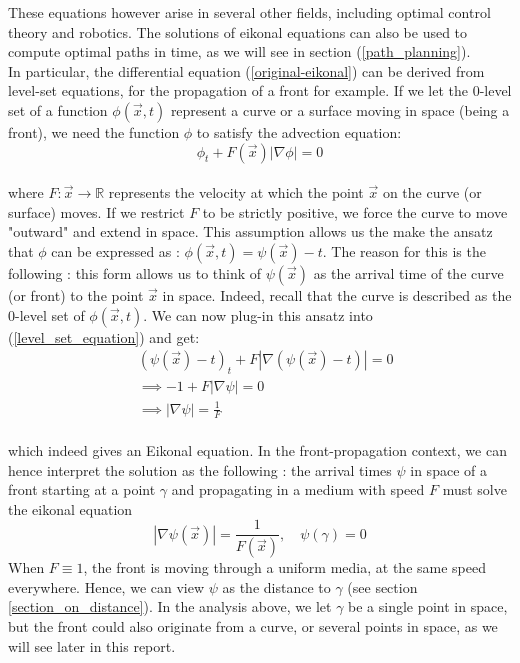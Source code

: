 \documentclass[11pt]{article}
\theoremstyle{definition}
\theoremstyle{remark}
\newcommand{\R}{\mathbb{R}}
\begin{document}
\noindent These equations however arise in several other fields, including optimal control theory and robotics. The solutions of eikonal equations can also be used to compute optimal paths in time, as we will see in section (\ref{path_planning}). \\

\noindent In particular, the differential equation (\ref{original-eikonal}) can be derived from level-set equations, for the propagation of a front for example. If we let the 0-level set of a function $\phi(\vec{x},t)$ represent a curve or a surface moving in space (being a front), we need the function $\phi$ to satisfy the advection equation: \\
\begin{equation}
\label{level_set_equation}
    \phi_t+F(\vec{x})|\nabla \phi| =0
\end{equation} \\
where $F:\vec{x}\rightarrow\R$ represents the velocity at which the point $\vec{x}$ on the curve (or surface) moves. If we restrict $F$ to be strictly positive, we force the curve to move "outward" and extend in space. This assumption allows us the make the ansatz that $\phi$ can be expressed as : $\phi(\vec{x},t)=\psi(\vec{x})-t$. The reason for this is the following : this form allows us to think of $\psi(\vec{x})$ as the arrival time of the curve (or front) to the point $\vec{x}$ in space. Indeed, recall that the curve is described as the 0-level set of $\phi(\vec{x},t)$. We can now plug-in this ansatz into (\ref{level_set_equation}) and get: \\
\begin{align*}
    & (\psi(\vec{x})-t)_t+F|\nabla(\psi(\vec{x})-t)|=0 \\
    &\implies-1 +F|\nabla\psi| = 0 \\
    &\implies |\nabla\psi|=\frac{1}{F}
\end{align*} \\
\noindent which indeed gives an Eikonal equation. In the front-propagation context, we can hence interpret the solution as the following : the arrival times $\psi$ in space of a front starting at a point $\gamma$ and propagating in a medium with speed $F$ must solve the eikonal equation
\begin{equation*}
    |\nabla\psi(\vec{x})|=\frac{1}{F(\vec{x})}, \quad \psi(\gamma)=0
\end{equation*}
When $F\equiv1$, the front is moving through a uniform media, at the same speed everywhere. Hence, we can view $\psi$ as the distance to $\gamma$ (see section \ref{section_on_distance}). In the analysis above, we let $\gamma$ be a single point in space, but the front could also originate from a curve, or several points in space, as we will see later in this report.
\end{document}
